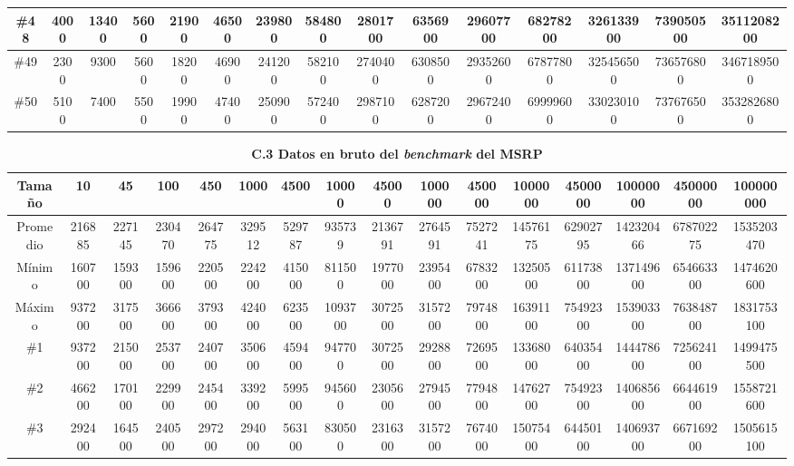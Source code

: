 \documentclass[titlepage]{article}
\begin{document}
\begin{landscape}
\begin{table}[h]
\begin{tabular}{|c|c|c|c|c|c|c|c|c|c|c|c|c|c|c|}
			\hline
			\#48     & 4000   & 13400 & 5600  & 21900 & 46500 & 239800 & 584800 & 2801700 & 6356900 & 29607700 & 68278200 & 326133900 & 739050500 & 3511208200  \\ 
			\hline
			\#49     & 2300   & 9300  & 5600  & 18200 & 46900 & 241200 & 582100 & 2740400 & 6308500 & 29352600 & 67877800 & 325456500 & 736576800 & 3467189500  \\ 
			\hline
			\#50     & 5100   & 7400  & 5500  & 19900 & 47400 & 250900 & 572400 & 2987100 & 6287200 & 29672400 & 69999600 & 330230100 & 737676500 & 3532826800  \\
			\hline
		\end{tabular}
	\end{table}
\end{landscape}

\begin{landscape}
	\begin{table}[h]
		\centering
		\smaller
		\caption*{\textbf{C.3 Datos en bruto del \textit{benchmark} del MSRP}}
		\begin{tabular}{|c|c|c|c|c|c|c|c|c|c|c|c|c|c|c|c|} 
			\hline
			Tamaño   & 10     & 45     & 100    & 450    & 1000   & 4500   & 10000   & 45000   & 100000  & 450000  & 1000000  & 4500000  & 10000000  & 45000000  & 100000000   \\ 
			\hline
			Promedio & 216885 & 227145 & 230470 & 264775 & 329512 & 529787 & 935739  & 2136791 & 2764591 & 7527241 & 14576175 & 62902795 & 142320466 & 678702275 & 1535203470  \\ 
			\hline
			Mínimo   & 160700 & 159300 & 159600 & 220500 & 224200 & 415000 & 811500  & 1977000 & 2395400 & 6783200 & 13250500 & 61173800 & 137149600 & 654663300 & 1474620600  \\ 
			\hline
			Máximo   & 937200 & 317500 & 366600 & 379300 & 424000 & 623500 & 1093700 & 3072500 & 3157200 & 7974800 & 16391100 & 75492300 & 153903300 & 763848700 & 1831753100  \\ 
			\hline
			\#1      & 937200 & 215000 & 253700 & 240700 & 350600 & 459400 & 947700  & 3072500 & 2928800 & 7269500 & 13368000 & 64035400 & 144478600 & 725624100 & 1499475500  \\ 
			\hline
			\#2      & 466200 & 170100 & 229900 & 245400 & 339200 & 599500 & 945600  & 2305600 & 2794500 & 7794800 & 14762700 & 75492300 & 140685600 & 664461900 & 1558721600  \\ 
			\hline
			\#3      & 292400 & 164500 & 240500 & 297200 & 294000 & 563100 & 830500  & 2316300 & 3157200 & 7674000 & 15075400 & 64450100 & 140693700 & 667169200 & 1505615100  \\ 

\end{tabular}
\end{table}
\end{landscape}
\end{document}
